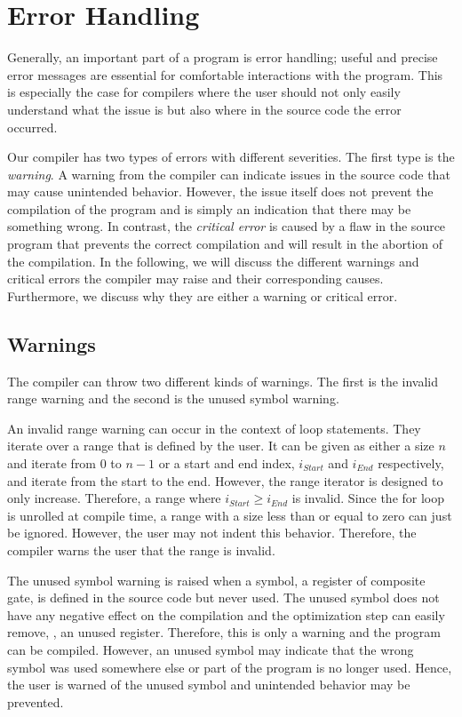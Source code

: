 \section{Error Handling}
Generally, an important part of a program is error handling; useful and precise error messages are essential for comfortable interactions with the program. This is especially the case for compilers where the user should not only easily understand what the issue is but also where in the source code the error occurred.  

Our compiler has two types of errors with different severities. The first type is the \emph{warning}. A warning from the compiler can indicate issues in the source code that may cause unintended behavior. However, the issue itself does not prevent the compilation of the program and is simply an indication that there may be something wrong. In contrast, the \emph{critical error} is caused by a flaw in the source program that prevents the correct compilation and will result in the abortion of the compilation. In the following, we will discuss the different warnings and critical errors the compiler may raise and their corresponding causes. Furthermore, we discuss why they are either a warning or critical error. 

\subsection{Warnings}
The compiler can throw two different kinds of warnings. The first is the invalid range warning and the second is the unused symbol warning.

An invalid range warning can occur in the context of loop statements. They iterate over a range that is defined by the user. It can be given as either a size $n$ and iterate from $0$ to $n-1$ or a start and end index, $i_{Start}$ and $i_{End}$ respectively, and iterate from the start to the end. However, the range iterator is designed to only increase. Therefore, a range where $i_{Start} \geq i_{End}$ is invalid. Since the for loop is unrolled at compile time, a range with a size less than or equal to zero can just be ignored. However, the user may not indent this behavior. Therefore, the compiler warns the user that the range is invalid.

The unused symbol warning is raised when a symbol, \eg a register of composite gate, is defined in the source code but never used. The unused symbol does not have any negative effect on the compilation and the optimization step can easily remove, \eg, an unused register. Therefore, this is only a warning and the program can be compiled. However, an unused symbol may indicate that the wrong symbol was used somewhere else or part of the program is no longer used. Hence, the user is warned of the unused symbol and unintended behavior may be prevented.


